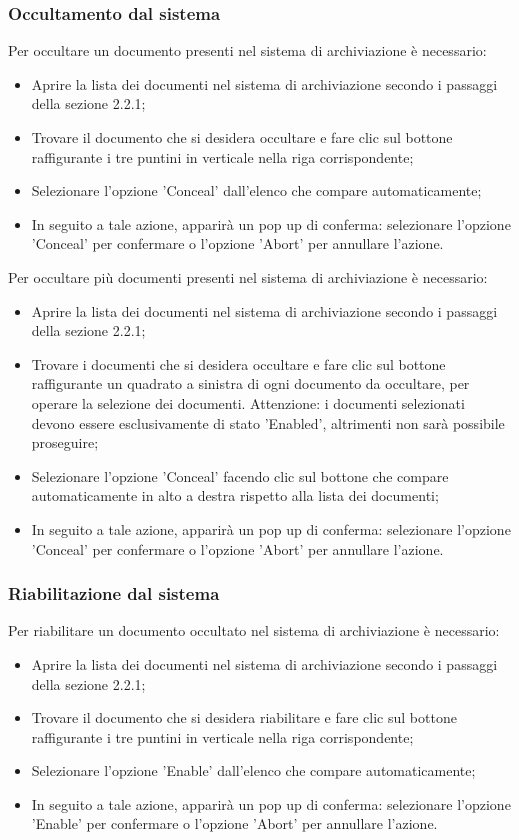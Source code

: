 \documentclass[10pt, a4paper]{article}
\begin{document}
\subsubsection{Occultamento dal sistema}
Per occultare un documento presenti nel sistema di archiviazione è necessario:
\begin{itemize}
    \item Aprire la lista dei documenti nel sistema di archiviazione secondo i passaggi della sezione 2.2.1;
    \item Trovare il documento che si desidera occultare e fare clic sul bottone raffigurante i tre puntini in verticale nella riga corrispondente;
    \item Selezionare l'opzione 'Conceal' dall'elenco che compare automaticamente;
    \item In seguito a tale azione, apparirà un pop up di conferma: selezionare l'opzione 'Conceal' per confermare o l'opzione 'Abort' per annullare l'azione.
\end{itemize}
Per occultare più documenti presenti nel sistema di archiviazione è necessario:
\begin{itemize}
    \item Aprire la lista dei documenti nel sistema di archiviazione secondo i passaggi della sezione 2.2.1;
    \item Trovare i documenti che si desidera occultare e fare clic sul bottone raffigurante un quadrato a sinistra di ogni documento da occultare, per operare la selezione dei documenti. Attenzione: i documenti selezionati devono essere esclusivamente di stato 'Enabled', altrimenti non sarà possibile proseguire;
    \item Selezionare l'opzione 'Conceal' facendo clic sul bottone che compare automaticamente in alto a destra rispetto alla lista dei documenti; 
    \item In seguito a tale azione, apparirà un pop up di conferma: selezionare l'opzione 'Conceal' per confermare o l'opzione 'Abort' per annullare l'azione.
\end{itemize}
\subsubsection{Riabilitazione dal sistema}
Per riabilitare un documento occultato nel sistema di archiviazione è necessario:
\begin{itemize}
    \item Aprire la lista dei documenti nel sistema di archiviazione secondo i passaggi della sezione 2.2.1;
    \item Trovare il documento che si desidera riabilitare e fare clic sul bottone raffigurante i tre puntini in verticale nella riga corrispondente;
    \item Selezionare l'opzione 'Enable' dall'elenco che compare automaticamente;
    \item In seguito a tale azione, apparirà un pop up di conferma: selezionare l'opzione 'Enable' per confermare o l'opzione 'Abort' per annullare l'azione.
\end{itemize}
\end{document}
